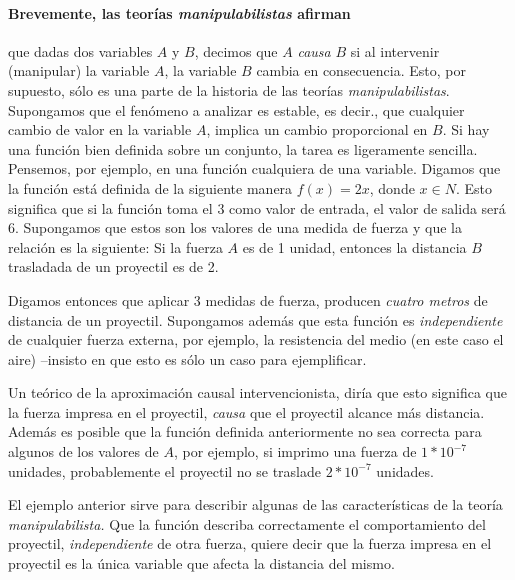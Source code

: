 \paragraph{Brevemente, las teorías \emph{manipulabilistas} afirman} que dadas dos variables $A$ y $B$, decimos que $A$ \emph{causa} $B$ si al intervenir (manipular) la variable $A$, la variable $B$ cambia en consecuencia.
Esto, por supuesto, sólo es una parte de la historia de las teorías
\emph{manipulabilistas}. Supongamos que el fenómeno a analizar es
estable, es decir., que cualquier cambio de valor en la variable $A$,
implica un cambio proporcional en $B$. Si hay una función bien
definida sobre un conjunto, la tarea es ligeramente sencilla.
Pensemos, por ejemplo, en una función cualquiera de una variable.
Digamos que la función está definida de la siguiente manera $f(x) =
2x$, donde $x \in {N}$. Esto significa que si la función toma el $3$
como valor de entrada, el valor de salida será $6$. Supongamos que
estos son los valores de una medida de fuerza y que la relación es la
siguiente: Si la fuerza $A$ es de 1 unidad, entonces la distancia $B$
trasladada de un proyectil es de 2.

Digamos entonces que aplicar 3 medidas de fuerza, producen
\emph{cuatro metros} de distancia de un proyectil. Supongamos además
que esta función es \emph{independiente} de cualquier fuerza externa,
por ejemplo, la resistencia del medio (en este caso el aire)
--insisto en que esto es sólo un caso para ejemplificar.

Un teórico de la aproximación causal intervencionista, diría que
esto significa que la fuerza impresa en el proyectil, \emph{causa}
que el proyectil alcance más distancia. Además es posible que la
función definida anteriormente no sea correcta para algunos de los
valores de $A$, por ejemplo, si imprimo una fuerza de $1*10^{-7}$
unidades, probablemente el proyectil no se traslade $2*10^{-7}$
unidades.

El ejemplo anterior sirve para describir algunas de las características de la teoría \emph{manipulabilista.}
Que la función describa correctamente el comportamiento del
proyectil, \emph{independiente} de otra fuerza, quiere decir que la
fuerza impresa en el proyectil es la única variable que afecta la
distancia del mismo.

